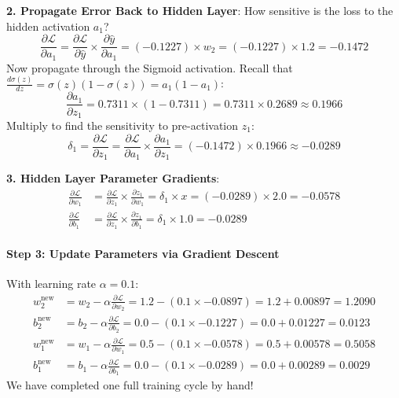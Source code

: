 \textbf{2. Propagate Error Back to Hidden Layer}:
How sensitive is the loss to the hidden activation $a_1$?
\begin{equation*}
\frac{\partial \mathcal{L}}{\partial a_1} = \frac{\partial \mathcal{L}}{\partial \hat{y}} \times \frac{\partial \hat{y}}{\partial a_1} = (-0.1227) \times w_2 = (-0.1227) \times 1.2 = \mathbf{-0.1472}
\end{equation*}
Now propagate through the Sigmoid activation. Recall that $\frac{d\sigma(z)}{dz} = \sigma(z)(1 - \sigma(z)) = a_1(1 - a_1)$:
\begin{equation*}
\frac{\partial a_1}{\partial z_1} = 0.7311 \times (1 - 0.7311) = 0.7311 \times 0.2689 \approx \mathbf{0.1966}
\end{equation*}
Multiply to find the sensitivity to pre-activation $z_1$:
\begin{equation*}
\delta_1 = \frac{\partial \mathcal{L}}{\partial z_1} = \frac{\partial \mathcal{L}}{\partial a_1} \times \frac{\partial a_1}{\partial z_1} = (-0.1472) \times 0.1966 \approx \mathbf{-0.0289}
\end{equation*}

\textbf{3. Hidden Layer Parameter Gradients}:
\begin{align*}
\frac{\partial \mathcal{L}}{\partial w_1} &= \frac{\partial \mathcal{L}}{\partial z_1} \times \frac{\partial z_1}{\partial w_1} = \delta_1 \times x = (-0.0289) \times 2.0 = \mathbf{-0.0578} \\
\frac{\partial \mathcal{L}}{\partial b_1} &= \frac{\partial \mathcal{L}}{\partial z_1} \times \frac{\partial z_1}{\partial b_1} = \delta_1 \times 1.0 = \mathbf{-0.0289}
\end{align*}

\paragraph{Step 3: Update Parameters via Gradient Descent}
With learning rate $\alpha = 0.1$:
\begin{align*}
w_2^{\text{new}} &= w_2 - \alpha \frac{\partial \mathcal{L}}{\partial w_2} = 1.2 - (0.1 \times -0.0897) = 1.2 + 0.00897 = \mathbf{1.2090} \\
b_2^{\text{new}} &= b_2 - \alpha \frac{\partial \mathcal{L}}{\partial b_2} = 0.0 - (0.1 \times -0.1227) = 0.0 + 0.01227 = \mathbf{0.0123} \\
w_1^{\text{new}} &= w_1 - \alpha \frac{\partial \mathcal{L}}{\partial w_1} = 0.5 - (0.1 \times -0.0578) = 0.5 + 0.00578 = \mathbf{0.5058} \\
b_1^{\text{new}} &= b_1 - \alpha \frac{\partial \mathcal{L}}{\partial b_1} = 0.0 - (0.1 \times -0.0289) = 0.0 + 0.00289 = \mathbf{0.0029}
\end{align*}
We have completed one full training cycle by hand!

